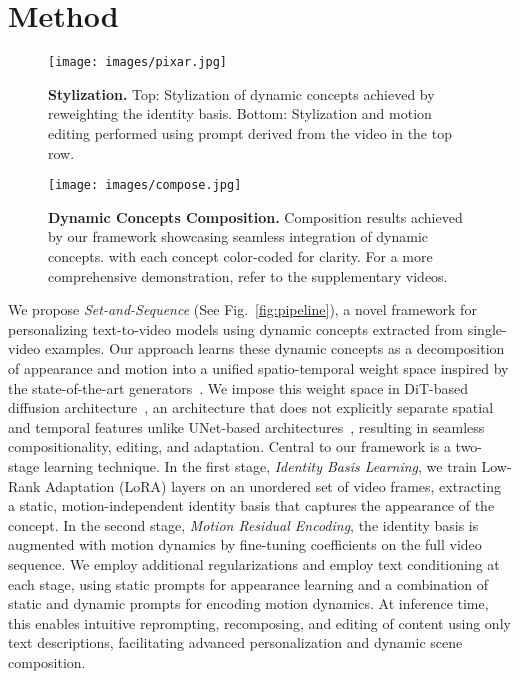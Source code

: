 
\section{Method}


\begin{figure}[t!]
    \centering
    \texttt{[image: images/pixar.jpg]}
    \caption{\textbf{Stylization.} Top: Stylization of dynamic concepts achieved by reweighting the identity basis. Bottom: Stylization and motion editing performed using prompt derived from the video in the top row. } 
    \label{fig:pixar}
\end{figure}



\begin{figure*}[t!]
    \centering
    \texttt{[image: images/compose.jpg]}
    \caption{\textbf{Dynamic Concepts Composition.} Composition results achieved by our framework showcasing seamless integration of dynamic concepts. with each concept color-coded for clarity. For a more comprehensive demonstration, refer to the supplementary videos.}
    \label{fig:compose}
\end{figure*}






We propose \textit{Set-and-Sequence} (See Fig.~\ref{fig:pipeline}), a novel framework for personalizing text-to-video models using dynamic concepts extracted from single-video examples. Our approach learns these dynamic concepts as a decomposition of appearance and motion into a unified spatio-temporal weight space inspired by the state-of-the-art generators~\cite{menapace2024snap, sora}. We impose this weight space in DiT-based diffusion architecture~\cite{Peebles2023DiT}, an architecture that does not explicitly separate spatial and temporal features unlike UNet-based architectures~\cite{ren2024customize}, resulting in seamless compositionality, editing, and adaptation. Central to our framework is a two-stage learning technique. In the first stage, \textit{Identity Basis Learning}, we train Low-Rank Adaptation (LoRA) layers on an unordered set of video frames, extracting a static, motion-independent identity basis that captures the appearance of the concept. In the second stage, \textit{Motion Residual Encoding}, the identity basis is augmented with motion dynamics by fine-tuning coefficients on the full video sequence. We employ additional regularizations and employ text conditioning at each stage, using static prompts for appearance learning and a combination of static and dynamic prompts for encoding motion dynamics. At inference time, this enables intuitive reprompting, recomposing, and editing of content using only text descriptions, facilitating advanced personalization and dynamic scene composition.



